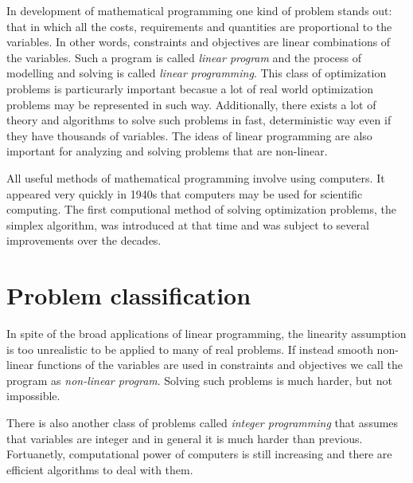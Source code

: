 In development of mathematical programming one kind of problem stands out: that in which all the costs, requirements and quantities are proportional to the variables. In other words, constraints and objectives are linear combinations of the variables. Such a program is called \emph{linear program} and the process of modelling and solving is called \emph{linear programming}. This class of optimization problems is particurarly important becasue a lot of real world optimization problems may be represented in such way. Additionally, there exists a lot of theory and algorithms to solve such problems in fast, deterministic way even if they have thousands of variables. The ideas of linear programming are also important for analyzing and solving problems that are non-linear.

All useful methods of mathematical programming involve using computers. It appeared very quickly in 1940s that computers may be used for scientific computing. The first computional method of solving optimization problems, the simplex algorithm, was introduced at that time and was subject to several improvements over the decades.

\section{Problem classification}
\label{sec:ampl:classification}

In spite of the broad applications of linear programming, the linearity assumption is too unrealistic to be applied to many of real problems. If instead smooth non-linear functions of the variables are used in constraints and objectives we call the program as \emph{non-linear program}. Solving such problems is much harder, but not impossible.

There is also another class of problems called \emph{integer programming} that assumes that variables are integer and in general it is much harder than previous. Fortuanetly, computational power of computers is still increasing and there are efficient algorithms to deal with them.

